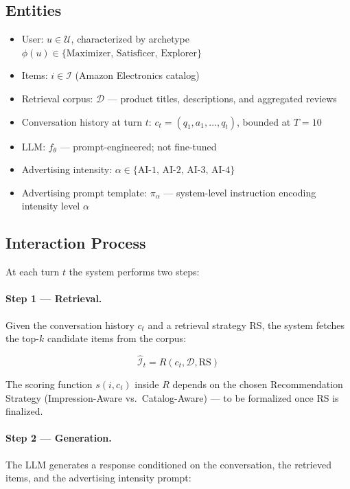 \documentclass{article}
\begin{document}
 
\subsection{Entities}
 
\begin{itemize}
    \item User: $u \in \mathcal{U}$, characterized by archetype $\phi(u) \in \{\text{Maximizer, Satisficer, Explorer}\}$
    \item Items: $i \in \mathcal{I}$ (Amazon Electronics catalog)
    \item Retrieval corpus: $\mathcal{D}$ — product titles, descriptions, and aggregated reviews
    \item Conversation history at turn $t$: $c_t = (q_1, a_1, \ldots, q_t)$, bounded at $T = 10$
    \item LLM: $f_\theta$ — prompt-engineered; not fine-tuned
    \item Advertising intensity: $\alpha \in \{\text{AI-1, AI-2, AI-3, AI-4}\}$
    \item Advertising prompt template: $\pi_\alpha$ — system-level instruction encoding intensity level $\alpha$
\end{itemize}
 
\subsection{Interaction Process}
 
At each turn $t$ the system performs two steps:
 
\paragraph{Step 1 — Retrieval.} Given the conversation history $c_t$ and a retrieval strategy RS, the system fetches the top-$k$ candidate items from the corpus:
 
\begin{equation}
    \hat{\mathcal{I}}_t = R(c_t, \mathcal{D}, \text{RS})
\end{equation}
 
The scoring function $s(i, c_t)$ inside $R$ depends on the chosen Recommendation Strategy (Impression-Aware vs.\ Catalog-Aware) — to be formalized once RS is finalized.
 
\paragraph{Step 2 — Generation.} The LLM generates a response conditioned on the conversation, the retrieved items, and the advertising intensity prompt:
 
\end{document}
